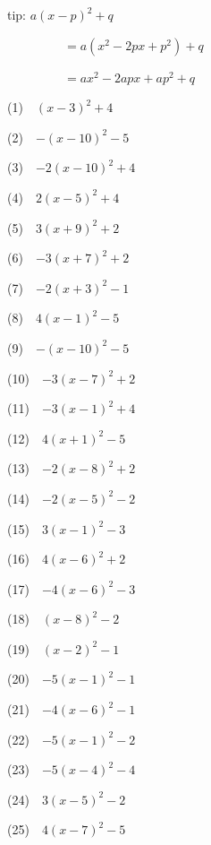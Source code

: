 \documentclass[a4j,twocolumn,10pt,fleqn]{jarticle}
\begin{document}
tip: $a(x - p)^2 + q$

~~~~~~~~~$= a(x^2 - 2px + p^2) + q$

~~~~~~~~~$= ax^2 - 2apx + ap^2 + q$

(1)~~$(x-3)^2 +4$

(2)~~$-(x-10)^2-5$

(3)~~$-2(x-10)^2 +4$

(4)~~$2(x-5)^2 +4$

(5)~~$3(x +9)^2 +2$

(6)~~$-3(x +7)^2 +2$

(7)~~$-2(x +3)^2-1$

(8)~~$4(x-1)^2-5$

(9)~~$-(x-10)^2-5$

(10)~~$-3(x-7)^2 +2$

(11)~~$-3(x-1)^2 +4$

(12)~~$4(x +1)^2-5$

(13)~~$-2(x-8)^2 +2$

(14)~~$-2(x-5)^2-2$

(15)~~$3(x-1)^2-3$

(16)~~$4(x-6)^2 +2$

(17)~~$-4(x-6)^2-3$

(18)~~$(x-8)^2-2$

(19)~~$(x-2)^2-1$

(20)~~$-5(x-1)^2-1$

(21)~~$-4(x-6)^2-1$

(22)~~$-5(x-1)^2-2$

(23)~~$-5(x-4)^2-4$

(24)~~$3(x-5)^2-2$

(25)~~$4(x-7)^2-5$
\end{document}
